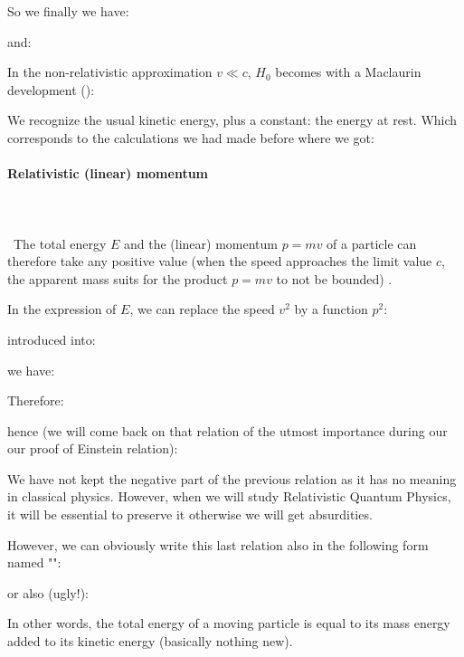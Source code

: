 	So we finally we have:
	
	and:
	
	In the non-relativistic approximation $v\ll c$, $H_0$ becomes with a Maclaurin development ():
	
	We recognize the usual kinetic energy, plus a constant: the energy at rest. Which corresponds to the calculations we had made before where we got:
	

	\paragraph{Relativistic (linear) momentum}\label{relativistic linear momentum}\mbox{}\\\\\
	The total energy $E$ and the (linear) momentum $p=mv$ of a particle can therefore take any positive value (when the speed approaches the limit value $c$, the apparent mass suits for the product $p=mv$ to not be bounded) .

	In the expression of $E$, we can replace the speed $v^2$ by a function $p^2$:
	
	introduced into:
	
	we have:
	
	Therefore:
	
	hence (we will come back on that relation of the utmost importance during our our proof of Einstein relation):
	
	We have not kept the negative part of the previous relation as it has no meaning in classical physics. However, when we will study Relativistic Quantum Physics, it will be essential to preserve it otherwise we will get absurdities.

	However, we can obviously write this last relation also in the following form named "\label{relativistic mass momentum relation}":
	
	or also (ugly!):
	
	In other words, the total energy of a moving particle is equal to its mass energy added to its kinetic energy (basically nothing new).
	
